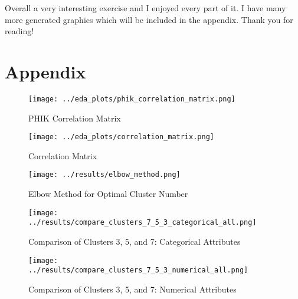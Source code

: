 \documentclass[a4paper,12pt]{article}
\begin{document}
Overall a very interesting exercise and I enjoyed every part of it. I have many more generated graphics which will be included in the appendix. Thank you for reading!

\newpage
\appendix
\section*{Appendix}

\begin{figure}[h]
  \centering
  \texttt{[image: ../eda\_plots/phik\_correlation\_matrix.png]}
  \caption{PHIK Correlation Matrix}
\end{figure}

\begin{figure}[h]
  \centering
  \texttt{[image: ../eda\_plots/correlation\_matrix.png]}
  \caption{Correlation Matrix}
\end{figure}

\begin{figure}[h]
  \centering
  \texttt{[image: ../results/elbow\_method.png]}
  \caption{Elbow Method for Optimal Cluster Number}
\end{figure}

\begin{figure}[h]
  \centering
  \texttt{[image: ../results/compare\_clusters\_7\_5\_3\_categorical\_all.png]}
  \caption{Comparison of Clusters 3, 5, and 7: Categorical Attributes}
\end{figure}

\begin{figure}[h]
  \centering
  \texttt{[image: ../results/compare\_clusters\_7\_5\_3\_numerical\_all.png]}
  \caption{Comparison of Clusters 3, 5, and 7: Numerical Attributes}
\end{figure}
\end{document}
